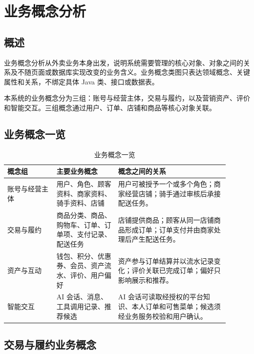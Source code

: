\section{业务概念分析}

\subsection{概述}

业务概念分析从外卖业务本身出发，说明系统需要管理的核心对象、对象之间的关系及不随页面或数据库实现改变的业务含义。业务概念类图只表达领域概念、关键属性和关系，不绑定具体 Java 类、接口或数据表。

本系统的业务概念分为三组：账号与经营主体，交易与履约，以及营销资产、评价和智能交互。三组概念通过用户、订单、店铺和商品等核心对象关联。

\subsection{业务概念一览}

\begin{longtable}{|L{0.20\linewidth}|L{0.25\linewidth}|L{0.45\linewidth}|}
\caption{业务概念一览}\label{tab:business-concepts}\\ \hline
\textbf{概念组} & \textbf{主要业务概念} & \textbf{概念之间的关系} \\ \hline
账号与经营主体 & 用户、角色、顾客资料、商家资料、骑手资料、店铺 & 用户可被授予一个或多个角色；商家经营店铺；骑手通过审核后承接配送任务。 \\ \hline
交易与履约 & 商品分类、商品、购物车、订单、订单项、支付记录、配送任务 & 店铺提供商品；顾客从同一店铺商品形成订单；订单支付并由商家处理后产生配送任务。 \\ \hline
资产与互动 & 钱包、积分、优惠券、会员、资产流水、评价、用户偏好 & 资产参与订单结算并以流水记录变化；评价关联已完成订单；偏好只影响展示和推荐。 \\ \hline
智能交互 & AI 会话、消息、工具调用记录、推荐候选 & AI 会话可读取经授权的平台知识、本人订单和可售菜单；候选须经业务服务校验和用户确认。 \\ \hline
\end{longtable}

\subsection{交易与履约业务概念}

